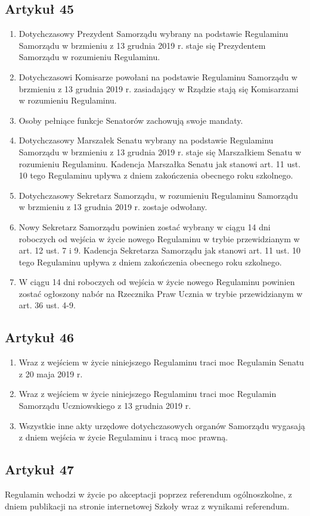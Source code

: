 \documentclass[14pt]{article}
\newenvironment{ustepy}{%
	\begin{enumerate}[leftmargin=1.5em, itemindent=1pt, labelwidth=1em, itemsep=5pt]
	}{%
	\end{enumerate}
}
\begin{document}
\subsection*{Artykuł 45}
\begin{ustepy}
	\item Dotychczasowy Prezydent Samorządu wybrany na podstawie Regulaminu Samorządu w brzmieniu z 13 grudnia 2019 r. staje się Prezydentem Samorządu w rozumieniu Regulaminu.
	\item Dotychczasowi Komisarze powołani na podstawie Regulaminu Samorządu w brzmieniu z 13 grudnia 2019 r. zasiadający w Rządzie stają się Komisarzami w rozumieniu Regulaminu.
	\item Osoby pełniące funkcje Senatorów zachowują swoje mandaty.
	\item Dotychczasowy Marszałek Senatu wybrany na podstawie Regulaminu Samorządu w brzmieniu z 13 grudnia 2019 r. staje się Marszałkiem Senatu w rozumieniu Regulaminu. Kadencja Marszałka Senatu jak stanowi art. 11 ust. 10 tego Regulaminu upływa z dniem zakończenia obecnego roku szkolnego.
	\item Dotychczasowy Sekretarz Samorządu, w rozumieniu Regulaminu Samorządu w brzmieniu z 13 grudnia 2019 r. zostaje odwołany.
	\item Nowy Sekretarz Samorządu powinien zostać wybrany w ciągu 14 dni roboczych od wejścia w życie nowego Regulaminu w trybie przewidzianym w art. 12 ust. 7 i 9. Kadencja Sekretarza Samorządu jak stanowi art. 11 ust. 10 tego Regulaminu upływa z dniem zakończenia obecnego roku szkolnego.
	\item W ciągu 14 dni roboczych od wejścia w życie nowego Regulaminu powinien zostać ogłoszony nabór na Rzecznika Praw Ucznia w trybie przewidzianym w art. 36 ust. 4-9.
\end{ustepy}
\subsection*{Artykuł 46}
\begin{ustepy}
	\item Wraz z wejściem w życie niniejszego Regulaminu traci moc Regulamin Senatu z 20 maja 2019 r.
	\item Wraz z wejściem w życie niniejszego Regulaminu traci moc Regulamin Samorządu Uczniowskiego z 13 grudnia 2019 r.
	\item Wszystkie inne akty urzędowe dotychczasowych organów Samorządu wygasają z dniem wejścia w życie Regulaminu i tracą moc prawną.
\end{ustepy}
\subsection*{Artykuł 47}
Regulamin wchodzi w życie po akceptacji poprzez referendum ogólnoszkolne, z dniem publikacji na stronie internetowej Szkoły wraz z wynikami referendum.

	
\end{document}
